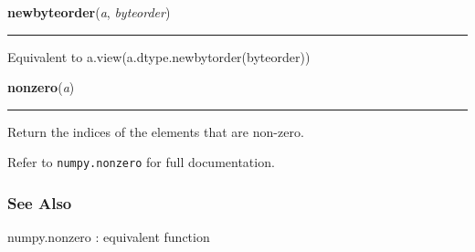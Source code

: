     \label{numpy:ndarray:newbyteorder}

    \vspace{0.5ex}

    \begin{boxedminipage}{\textwidth}

    \raggedright \textbf{newbyteorder}(\textit{a}, \textit{byteorder})

    \vspace{-1.5ex}

    \rule{\textwidth}{0.5\fboxrule}

Equivalent to a.view(a.dtype.newbytorder(byteorder))
    \vspace{1ex}

    \end{boxedminipage}

    \label{numpy:ndarray:nonzero}

    \vspace{0.5ex}

    \begin{boxedminipage}{\textwidth}

    \raggedright \textbf{nonzero}(\textit{a})

    \vspace{-1.5ex}

    \rule{\textwidth}{0.5\fboxrule}

Return the indices of the elements that are non-zero.

Refer to \texttt{numpy.nonzero} for full documentation.



\hypertarget{see-also}{}
\subsubsection*{See Also}

numpy.nonzero : equivalent function
    \vspace{1ex}

    \end{boxedminipage}

    \label{numpy:ndarray:prod}

    \vspace{0.5ex}

